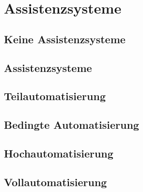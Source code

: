 




\section{Assistenzsysteme}
\subsection{Keine Assistenzsysteme}
\subsection{Assistenzsysteme}
\subsection{Teilautomatisierung}
\subsection{Bedingte Automatisierung}
\subsection{Hochautomatisierung}
\subsection{Vollautomatisierung}









